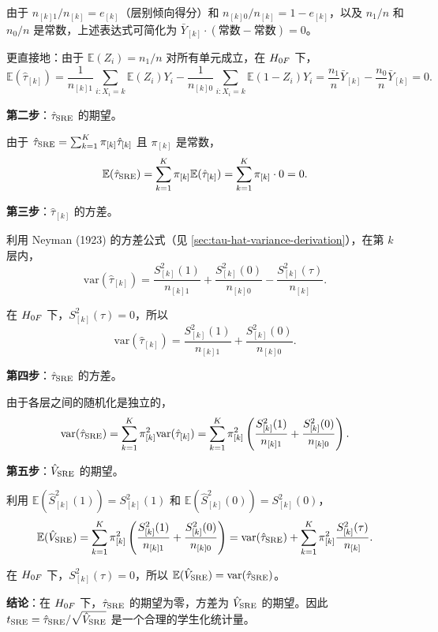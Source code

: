 由于 $n_{[k]1}/n_{[k]} = e_{[k]}$（层别倾向得分）和 $n_{[k]0}/n_{[k]} = 1 - e_{[k]}$，以及 $n_1/n$ 和 $n_0/n$ 是常数，上述表达式可简化为 $\bar{Y}_{[k]} \cdot (\text{常数} - \text{常数}) = 0$。

更直接地：由于 $\mathbb{E}(Z_i) = n_1/n$ 对所有单元成立，在 $H_{0F}$ 下，
\[
\mathbb{E}(\hat{\tau}_{[k]}) = \frac{1}{n_{[k]1}} \sum_{i: X_i=k} \mathbb{E}(Z_i) Y_i - \frac{1}{n_{[k]0}} \sum_{i: X_i=k} \mathbb{E}(1-Z_i) Y_i = \frac{n_1}{n} \bar{Y}_{[k]} - \frac{n_0}{n} \bar{Y}_{[k]} = 0.
\]

\textbf{第二步}：$\hat{\tau}_{\text{SRE}}$ 的期望。

由于 $\hat{\tau}_{\text{SRE}} = \sum_{k=1}^K \pi_{[k]} \hat{\tau}_{[k]}$ 且 $\pi_{[k]}$ 是常数，
\[
\mathbb{E}(\hat{\tau}_{\text{SRE}}) = \sum_{k=1}^K \pi_{[k]} \mathbb{E}(\hat{\tau}_{[k]}) = \sum_{k=1}^K \pi_{[k]} \cdot 0 = 0.
\]

\textbf{第三步}：$\hat{\tau}_{[k]}$ 的方差。

利用 Neyman (1923) 的方差公式（见 \cref{sec:tau-hat-variance-derivation}），在第 $k$ 层内，
\[
\text{var}(\hat{\tau}_{[k]}) = \frac{S_{[k]}^2(1)}{n_{[k]1}} + \frac{S_{[k]}^2(0)}{n_{[k]0}} - \frac{S_{[k]}^2(\tau)}{n_{[k]}}.
\]

在 $H_{0F}$ 下，$S_{[k]}^2(\tau) = 0$，所以
\[
\text{var}(\hat{\tau}_{[k]}) = \frac{S_{[k]}^2(1)}{n_{[k]1}} + \frac{S_{[k]}^2(0)}{n_{[k]0}}.
\]

\textbf{第四步}：$\hat{\tau}_{\text{SRE}}$ 的方差。

由于各层之间的随机化是独立的，
\[
\text{var}(\hat{\tau}_{\text{SRE}}) = \sum_{k=1}^K \pi_{[k]}^2 \text{var}(\hat{\tau}_{[k]}) = \sum_{k=1}^K \pi_{[k]}^2 \left( \frac{S_{[k]}^2(1)}{n_{[k]1}} + \frac{S_{[k]}^2(0)}{n_{[k]0}} \right).
\]

\textbf{第五步}：$\hat{V}_{\text{SRE}}$ 的期望。

利用 $\mathbb{E}(\hat{S}_{[k]}^2(1)) = S_{[k]}^2(1)$ 和 $\mathbb{E}(\hat{S}_{[k]}^2(0)) = S_{[k]}^2(0)$，
\[
\mathbb{E}(\hat{V}_{\text{SRE}}) = \sum_{k=1}^K \pi_{[k]}^2 \left( \frac{S_{[k]}^2(1)}{n_{[k]1}} + \frac{S_{[k]}^2(0)}{n_{[k]0}} \right) = \text{var}(\hat{\tau}_{\text{SRE}}) + \sum_{k=1}^K \pi_{[k]}^2 \frac{S_{[k]}^2(\tau)}{n_{[k]}}.
\]

在 $H_{0F}$ 下，$S_{[k]}^2(\tau) = 0$，所以 $\mathbb{E}(\hat{V}_{\text{SRE}}) = \text{var}(\hat{\tau}_{\text{SRE}})$。

\textbf{结论}：在 $H_{0F}$ 下，$\hat{\tau}_{\text{SRE}}$ 的期望为零，方差为 $\hat{V}_{\text{SRE}}$ 的期望。因此 $t_{\text{SRE}} = \hat{\tau}_{\text{SRE}} / \sqrt{\hat{V}_{\text{SRE}}}$ 是一个合理的学生化统计量。

